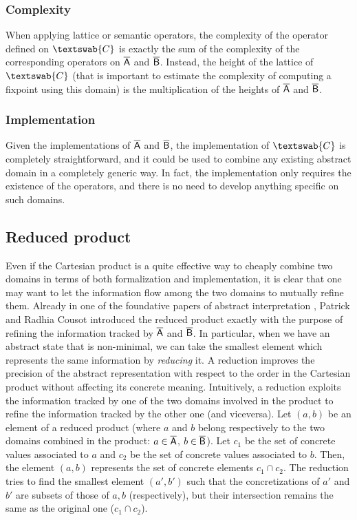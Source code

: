 \documentclass[submission,copyright,creativecommons]{eptcs}
\newcommand{\firstdomain}{\aset{A}}
\newcommand{\seconddomain}{\aset{B}}
\newcommand{\cartesiandomain}{\textswab{C}}
\begin{document}
\subsubsection{Complexity}
When applying lattice or semantic operators, the complexity of the operator defined on $\cartesiandomain$ is exactly the sum of the complexity of the corresponding operators on $\firstdomain$ and $\seconddomain$. Instead, the height of the lattice of $\cartesiandomain$ (that is important to estimate the complexity of computing a fixpoint using this domain) is the multiplication of the heights of $\firstdomain$ and $\seconddomain$.

\subsubsection{Implementation}
Given the implementations of $\firstdomain$ and $\seconddomain$, the implementation of $\cartesiandomain$ is completely straightforward, and it could be used to combine any existing abstract domain in a completely generic way. In fact, the implementation only requires the existence of the operators, and there is no need to develop anything specific on such domains.

\subsection{Reduced product}
Even if the Cartesian product is a quite effective way to cheaply combine two domains in terms of both formalization and implementation, it is clear that one may want to let the information flow among the two domains to mutually refine them. Already in one of the foundative papers of abstract interpretation \cite{CC79}, Patrick and Radhia Cousot introduced the reduced product exactly with the purpose of refining the information tracked by $\firstdomain$ and $\seconddomain$. In particular, when we have an abstract state that is non-minimal, we can take the smallest element which represents the same information by \emph{reducing} it. A reduction improves the precision of the abstract representation
with respect to the order in the Cartesian product without affecting its concrete meaning. Intuitively, a reduction exploits the information tracked by one of the two domains involved in the product to refine the information tracked by the other one (and viceversa). Let $(a,b)$ be an element of a reduced product (where $a$ and $b$ belong respectively to the two domains combined in the product: $a \in \firstdomain$, $b \in \seconddomain$). Let $c_1$ be the set of concrete values associated to $a$ and $c_2$ be the set of concrete values associated to $b$. Then, the element $(a,b)$ represents the set of concrete elements $c_1 \cap c_2$. The reduction tries to find the smallest element $(a',b')$ such that the concretizations of $a'$ and $b'$ are subsets of those of $a,b$ (respectively), but their intersection remains the same as the original one ($c_1 \cap c_2$).
\end{document}
